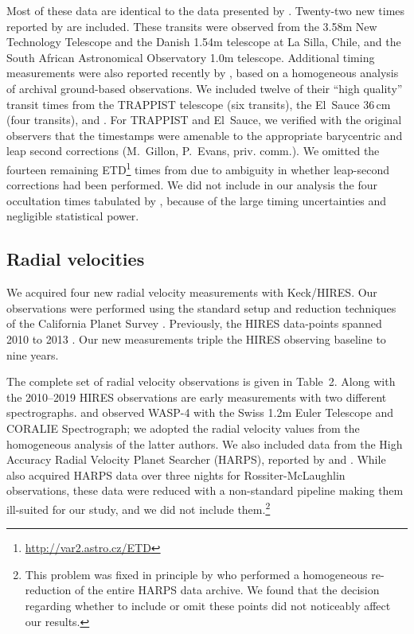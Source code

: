 \documentclass[12pt,twocolumn,tighten]{aastex62}
\begin{document}
Most of these data are identical to the data presented by
.  Twenty-two new times reported by
\citet{southworth_transit_2019} are included.  These transits were
observed from the 3.58m New Technology Telescope and the Danish 1.54m
telescope at La Silla, Chile, and the South African Astronomical
Observatory 1.0m telescope.  Additional timing measurements were also
reported recently by \citet{baluev_2019}, based on a homogeneous
analysis of archival ground-based observations.  We included twelve of
their ``high quality'' transit times from the TRAPPIST telescope (six
transits), the El~Sauce 36$\,$cm (four transits), and
\citet{petrucci_no_2013}.  For TRAPPIST and El~Sauce, we verified with
the original observers that the timestamps were amenable to the
appropriate barycentric and leap second corrections (M.~Gillon,
P.~Evans, priv{.} comm{.}).  We omitted the fourteen remaining
ETD\footnote{\url{http://var2.astro.cz/ETD}} times from
\citeauthor{baluev_2019} due to ambiguity in whether leap-second
corrections had been performed.  We did not include in our analysis
the four occultation times tabulated by
, because of the large timing
uncertainties and negligible statistical power.

\subsection{Radial velocities}

We acquired four new radial velocity measurements with Keck/HIRES.
Our observations were performed using the standard setup and reduction
techniques of the California Planet Survey \citep{howard_cps_2010}.
Previously, the HIRES data-points spanned 2010 to 2013
\citep{knutson_friends_2014}.  Our new measurements triple the HIRES
observing baseline to nine years.

The complete set of radial velocity observations is given in Table~2.
Along with the 2010--2019 HIRES observations are early measurements
with two different spectrographs.  \citet{wilson_wasp-4b_2008} and
\citet{triaud_spin-orbit_2010} observed WASP-4 with the Swiss 1.2m
Euler Telescope and CORALIE Spectrograph; we adopted the radial
velocity values from the homogeneous analysis of the latter authors.
We also included data from the High Accuracy Radial Velocity Planet
Searcher (HARPS), reported by \citet{pont_determining_2011} and
\citet{husnoo_observational_2012}.  While
\citet{triaud_spin-orbit_2010} also acquired HARPS data over three
nights for Rossiter-McLaughlin observations, these data were reduced
with a non-standard pipeline making them ill-suited for our study, and
we did not include them.\footnote{This problem was fixed in principle
by \citet{trifonov_public_2020} who performed a homogeneous
re-reduction of the entire HARPS data archive.  We found that the
decision regarding whether to include or omit these points did not
noticeably affect our results.}
\end{document}
